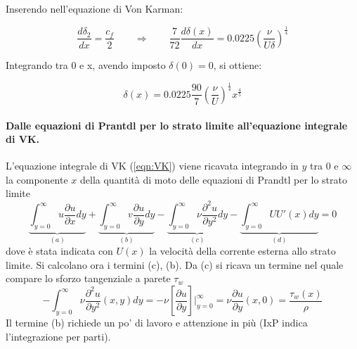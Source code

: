 Inserendo nell'equazione di Von Karman:

\begin{equation}
 \frac{d \delta_2}{dx}  = \frac{c_f}{2} \qquad\Rightarrow \qquad
  \frac{7}{72}\frac{d \delta(x)}{d x} = 0.0225 \displaystyle \left( \frac{\nu}{U \delta} \right)^{\frac{1}{4}}
\end{equation}

Integrando tra 0 e x, avendo imposto $\delta(0) = 0$, si ottiene:

\begin{equation}
  \delta(x) = 0.0225 \frac{90}{7} \displaystyle \left( \frac{\nu}{U } \right)^{\frac{1}{4}} x^{\frac{4}{5}}
\end{equation}

\vspace{3.0cm}
\paragraph{Dalle equazioni di Prantdl per lo strato limite all'equazione
 integrale di VK.} L'equazione integrale di VK (\ref{eqn:VK}) viene ricavata
 integrando in $y$ tra $0$ e $\infty$ la componente $x$ della quantità di
 moto delle equazioni di Prandtl per lo strato limite
\begin{equation}\label{eqn:VKint}
 \underbrace{\int_{y=0}^{\infty} u \dfrac{\partial u}{\partial x} dy}_{(a)} +
 \underbrace{\int_{y=0}^{\infty} v \dfrac{\partial u}{\partial y} dy}_{(b)} -
 \underbrace{\int_{y=0}^{\infty} \nu \dfrac{\partial^2 u}{\partial y^2} dy}_{(c)} -
 \underbrace{\int_{y=0}^{\infty} U U'(x)dy}_{(d)} = 0
\end{equation}
dove è stata indicata con $U(x)$ la velocità della corrente esterna allo strato 
 limite. Si calcolano ora i termini (c), (b). Da (c) si ricava un termine 
 nel quale compare lo sforzo tangenziale a parete $\tau_w$
 \begin{equation}\label{eqn:VKc}
  - \int_{y=0}^{\infty} \nu \dfrac{\partial^2 u}{\partial y^2}(x,y) dy = 
  - \nu \left[ \dfrac{\partial u}{\partial y}  \right]\Bigg|_{y=0}^{\infty} =
    \nu \dfrac{\partial u}{\partial y} (x,0) = \dfrac{\tau_w(x)}{\rho}
 \end{equation}
Il termine (b) richiede un po' di lavoro e attenzione in più (IxP indica l'integrazione per parti).
